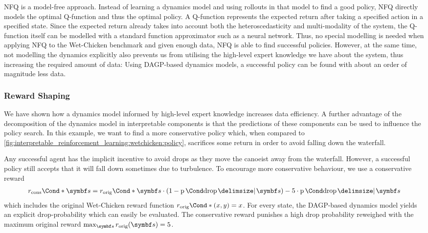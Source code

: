 NFQ is a model-free approach.
Instead of learning a dynamics model and using rollouts in that model to find a good policy, NFQ directly models the optimal Q-function and thus the optimal policy.
A Q-function represents the expected return after taking a specified action in a specified state.
Since the expected return already takes into account both the heteroscedasticity and multi-modality of the system, the Q-function itself can be modelled with a standard function approximator such as a neural network.
Thus, no special modelling is needed when applying NFQ to the Wet-Chicken benchmark and given enough data, NFQ is able to find successful policies.
However, at the same time, not modelling the dynamics explicitly also prevents us from utilising the high-level expert knowledge we have about the system, thus increasing the required amount of data:
Using DAGP-based dynamics models, a successful policy can be found with about an order of magnitude less data.


\subsubsection{Reward Shaping}
\label{sub:interpretable_reinforcement_learning:reward_shaping}
We have shown how a dynamics model informed by high-level expert knowledge increases data efficiency.
A further advantage of the decomposition of the dynamics model in interpretable components is that the predictions of these components can be used to influence the policy search.
In this example, we want to find a more conservative policy which, when compared to \cref{fig:interpretable_reinforcement_learning:wetchicken:policy}, sacrifices some return in order to avoid falling down the waterfall.

Any successful agent has the implicit incentive to avoid drops as they move the canoeist away from the waterfall.
However, a successful policy still accepts that it will fall down sometimes due to turbulence.
To encourage more conservative behaviour, we use a conservative reward
\begin{align}
    \Fun*{r_\text{cons}}{\mat{s}} =
    \Fun*{r_\text{orig}}{\mat{s}} \cdot \left(1 - \Prob{\text{drop} \given \mat{s}}\right)
    - 5 \cdot \Prob{\text{drop} \given \mat{s}}
\end{align}
which includes the original Wet-Chicken reward function $\Fun*{r_\text{orig}}{(x, y)} = x$.
For every state, the DAGP-based dynamics model yields an explicit drop-probability which can easily be evaluated.
The conservative reward punishes a high drop probability reweighed with the maximum original reward $\max_{\mat{s}} r_\text{orig}(\mat{s}) = 5$.

